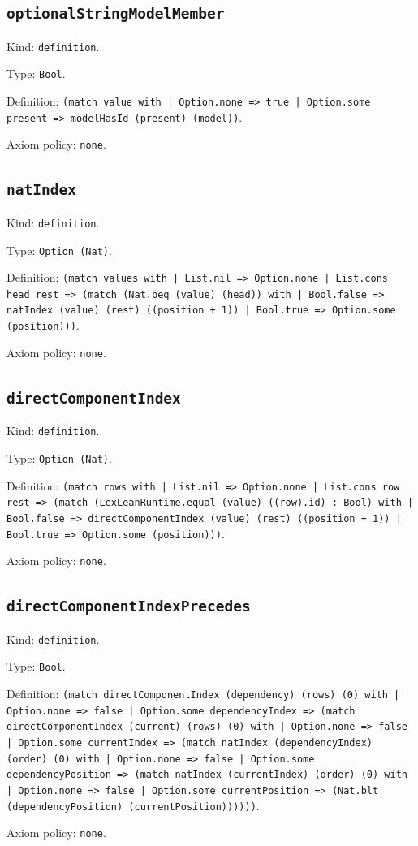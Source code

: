 \documentclass[11pt]{article}
\begin{document}
\subsection*{\texttt{optionalStringModelMember}}
\noindent Kind: \texttt{definition}.\par
\noindent Type: \texttt{Bool}.\par
\noindent Definition: \texttt{(match value with | Option.none => true | Option.some present => modelHasId (present) (model))}.\par
\noindent Axiom policy: \texttt{none}.\par
\subsection*{\texttt{natIndex}}
\noindent Kind: \texttt{definition}.\par
\noindent Type: \texttt{Option (Nat)}.\par
\noindent Definition: \texttt{(match values with | List.nil => Option.none | List.cons head rest => (match (Nat.beq (value) (head)) with | Bool.false => natIndex (value) (rest) ((position + 1)) | Bool.true => Option.some (position)))}.\par
\noindent Axiom policy: \texttt{none}.\par
\subsection*{\texttt{directComponentIndex}}
\noindent Kind: \texttt{definition}.\par
\noindent Type: \texttt{Option (Nat)}.\par
\noindent Definition: \texttt{(match rows with | List.nil => Option.none | List.cons row rest => (match (LexLeanRuntime.equal (value) ((row).id) : Bool) with | Bool.false => directComponentIndex (value) (rest) ((position + 1)) | Bool.true => Option.some (position)))}.\par
\noindent Axiom policy: \texttt{none}.\par
\subsection*{\texttt{directComponentIndexPrecedes}}
\noindent Kind: \texttt{definition}.\par
\noindent Type: \texttt{Bool}.\par
\noindent Definition: \texttt{(match directComponentIndex (dependency) (rows) (0) with | Option.none => false | Option.some dependencyIndex => (match directComponentIndex (current) (rows) (0) with | Option.none => false | Option.some currentIndex => (match natIndex (dependencyIndex) (order) (0) with | Option.none => false | Option.some dependencyPosition => (match natIndex (currentIndex) (order) (0) with | Option.none => false | Option.some currentPosition => (Nat.blt (dependencyPosition) (currentPosition))))))}.\par
\noindent Axiom policy: \texttt{none}.\par
\end{document}
